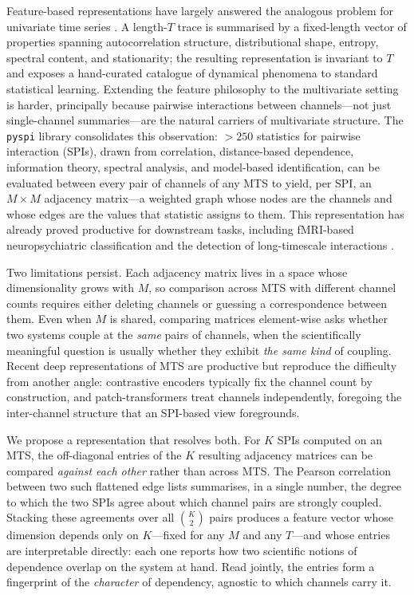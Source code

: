 \documentclass{article}
\theoremstyle{plain}
\theoremstyle{definition}
\theoremstyle{remark}
\begin{document}
Feature-based representations have largely answered the analogous problem for univariate time series \citep{fulcher2018featurebased,fulcher2017hctsa,lubba2019catch22,henderson2021empirical}. A length-$T$ trace is summarised by a fixed-length vector of properties spanning autocorrelation structure, distributional shape, entropy, spectral content, and stationarity; the resulting representation is invariant to $T$ and exposes a hand-curated catalogue of dynamical phenomena to standard statistical learning. Extending the feature philosophy to the multivariate setting is harder, principally because pairwise interactions between channels---not just single-channel summaries---are the natural carriers of multivariate structure. The \texttt{pyspi} library \citep{cliff2023unifying} consolidates this observation: $>250$ statistics for pairwise interaction (SPIs), drawn from correlation, distance-based dependence, information theory, spectral analysis, and model-based identification, can be evaluated between every pair of channels of any MTS to yield, per SPI, an $M{\times}M$ adjacency matrix---a weighted graph whose nodes are the channels and whose edges are the values that statistic assigns to them. This representation has already proved productive for downstream tasks, including fMRI-based neuropsychiatric classification \citep{bryant2024extracting} and the detection of long-timescale interactions \citep{nguyen2025feature}.

Two limitations persist. Each adjacency matrix lives in a space whose dimensionality grows with $M$, so comparison across MTS with different channel counts requires either deleting channels or guessing a correspondence between them. Even when $M$ is shared, comparing matrices element-wise asks whether two systems couple at the \emph{same} pairs of channels, when the scientifically meaningful question is usually whether they exhibit \emph{the same kind} of coupling. Recent deep representations of MTS \citep{yue2022ts2vec,zhang2022tfc,nie2023patchtst} are productive but reproduce the difficulty from another angle: contrastive encoders typically fix the channel count by construction, and patch-transformers treat channels independently, foregoing the inter-channel structure that an SPI-based view foregrounds.

We propose a representation that resolves both. For $K$ SPIs computed on an MTS, the off-diagonal entries of the $K$ resulting adjacency matrices can be compared \emph{against each other} rather than across MTS. The Pearson correlation between two such flattened edge lists summarises, in a single number, the degree to which the two SPIs agree about which channel pairs are strongly coupled. Stacking these agreements over all ${K \choose 2}$ pairs produces a feature vector whose dimension depends only on $K$---fixed for any $M$ and any $T$---and whose entries are interpretable directly: each one reports how two scientific notions of dependence overlap on the system at hand. Read jointly, the entries form a fingerprint of the \emph{character} of dependency, agnostic to which channels carry it.
\end{document}
